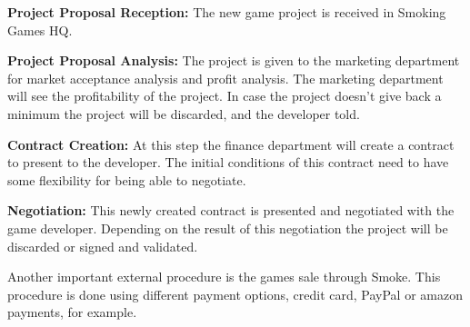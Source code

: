 \begin{description}
\item{\textbf{Project Proposal Reception: }}The new game project is received in Smoking Games HQ.
\item{\textbf{Project Proposal Analysis: }}The project is given to the marketing department for market acceptance analysis and profit analysis. The marketing department will see the profitability of the project. In case the project doesn't give back a minimum the project will be discarded, and the developer told.
\item{\textbf{Contract Creation: }}At this step the finance department will create a contract to present to the developer. The initial conditions of this contract need to have some flexibility for being able to negotiate. 
\item{\textbf{Negotiation: }}This newly created contract is presented and negotiated with the game developer. Depending on the result of this negotiation the project will be discarded or signed and validated.
\end{description}



\noindent Another important external procedure is the games sale through Smoke. This procedure is done using different payment options, credit card, PayPal or amazon payments, for example.